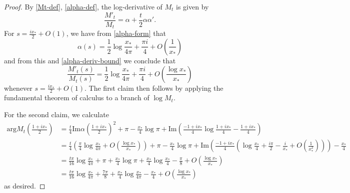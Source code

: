 \begin{proof}
By \eqref{Mt-def}, \eqref{alpha-def}, the log-derivative of $M_t$ is given by
\begin{equation}\label{mt-deriv}
 \frac{M'_t}{M_t} = \alpha + \frac{t}{2} \alpha \alpha'.
\end{equation}
For $s = \frac{ix_*}{2} + O(1)$, we have from \eqref{alpha-form} that
\begin{equation}\label{alpha-ex}
\alpha(s) = \frac{1}{2} \log \frac{x_*}{4\pi} + \frac{\pi i}{4} + O\left( \frac{1}{x_*}\right) 
\end{equation}
and from this and \eqref{alpha-deriv-bound} we conclude that
$$
 \frac{M'_t(s)}{M_t(s)} = \frac{1}{2} \log \frac{x_*}{4\pi} + \frac{\pi i}{4} + O\left( \frac{\log x_*}{x_*}\right) $$
whenever $s = \frac{ix_*}{2} + O(1)$.  The first claim then follows by applying the fundamental theorem of calculus to a branch of $\log M_t$.

For the second claim, we calculate
\begin{align*}
\mathrm{arg} M_t\left(\frac{1+ix_*}{2}\right) &= \frac{t}{4} \mathrm{Im} \alpha\left(\frac{1+ix_*}{2}\right)^2 + \pi - \frac{x_*}{4} \log \pi + \mathrm{Im}\left( \frac{-1+ix_*}{4} \log \frac{1+ix_*}{4} - \frac{1+ix_*}{4}\right) \\
&= \frac{t}{4} \left(\frac{\pi}{4} \log \frac{x_*}{4\pi} + O(\frac{\log x_*}{x_*})\right) + \pi - \frac{x_*}{4} \log \pi 
+ \mathrm{Im}\left( \frac{-1+ix_*}{4} \left(\log \frac{x_*}{4} + \frac{i\pi}{2} - \frac{i}{x_*} + O\left(\frac{1}{x_*^2}\right) \right) \right) - \frac{x_*}{4} \\
&= \frac{t \pi}{16} \log \frac{x_*}{4\pi} + \pi + \frac{x_*}{4} \log \pi 
+ \frac{x_*}{4} \log \frac{x_*}{4} - \frac{\pi}{8} + O\left( \frac{\log x_*}{x_*} \right) \\
&= \frac{t \pi}{16} \log \frac{x_*}{4\pi} + \frac{7\pi}{8} 
+ \frac{x_*}{4} \log \frac{x_*}{4\pi} - \frac{x_*}{4} + O\left( \frac{\log x_*}{x_*} \right) 
\end{align*}
as desired.
\end{proof}

